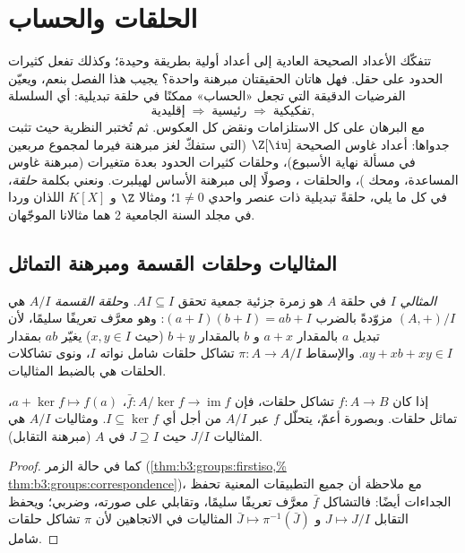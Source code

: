 \chapter{الحلقات والحساب}\label{ch:b3:rings}

تتفكّك الأعداد الصحيحة العادية إلى أعداد أولية بطريقة وحيدة؛ وكذلك
تفعل كثيرات الحدود على حقل. فهل هاتان الحقيقتان مبرهنة واحدة؟
يجيب هذا الفصل بنعم، ويعيّن الفرضيات الدقيقة التي تجعل «الحساب»
ممكنًا في حلقة تبديلية: أي السلسلة
\[
\text{إقليدية} \;\Longrightarrow\; \text{رئيسية}
\;\Longrightarrow\; \text{تفكيكية},
\]
مع البرهان على كل الاستلزامات ونقض كل العكوس. ثم تُختبر النظرية
حيث تثبت جدواها: أعداد غاوس الصحيحة $\Z[\iu]$ (التي ستفكّ لغز
مبرهنة فيرما لمجموع مربعين في مسألة نهاية الأسبوع)، وحلقات
كثيرات الحدود بعدة متغيرات (مبرهنة غاوس المساعدة، ومحك
)، والحلقات ، وصولًا إلى مبرهنة الأساس لهيلبرت.
ونعني بكلمة \emph{حلقة}، في كل ما يلي، حلقةً تبديلية ذات عنصر
واحدي $1 \neq 0$؛ ومثالا $\Z$ و $K[X]$ اللذان وردا في مجلد السنة
الجامعية 2 هما مثالانا الموجّهان.

\section{المثاليات وحلقات القسمة ومبرهنة التماثل}

\begin{definition}\label{def:b3:rings:ideal}
\emph{المثالي} $I$ في حلقة $A$ هو زمرة جزئية جمعية
تحقق $AI \subseteq I$. و\emph{حلقة القسمة}
$A/I$ هي  $(A, +)/I$ مزوّدةً بالضرب $(a + I)(b + I) = ab + I$: وهو معرَّف
تعريفًا سليمًا، لأن تبديل $a$ بالمقدار $a + x$ و $b$ بالمقدار $b + y$ (حيث
$x, y \in I$) يغيّر $ab$ بمقدار $ay + xb + xy \in I$. والإسقاط $\pi \colon A
\to A/I$ تشاكل
حلقات شامل نواته $I$، ونوى تشاكلات الحلقات هي بالضبط المثاليات.
\end{definition}

\begin{theorem}\label{thm:b3:rings:firstiso}
إذا كان $f \colon A \to B$ تشاكل حلقات، فإن $\bar f\colon
A/\ker f \to \operatorname{im} f$، $a + \ker f \mapsto f(a)$، تماثل حلقات.
وبصورة أعمّ، يتحلّل $f$ عبر $A/I$ من أجل أي  $I \subseteq \ker f$. ومثاليات
$A/I$ هي المثاليات $J/I$ حيث $J \supseteq I$  في $A$ (مبرهنة
التقابل).
\end{theorem}

\begin{proof}
كما في حالة الزمر (\cref{thm:b3:groups:firstiso,%
thm:b3:groups:correspondence})، مع ملاحظة أن جميع التطبيقات
المعنية تحفظ الجداءات أيضًا: فالتشاكل $\bar f$ معرَّف تعريفًا
سليمًا، وتقابلي على صورته، وضربي؛ ويحفظ التقابل $J \mapsto J/I$
و $\bar J \mapsto \pi^{-1}(\bar J)$ المثاليات في الاتجاهين لأن $\pi$ تشاكل حلقات شامل.
\end{proof}

